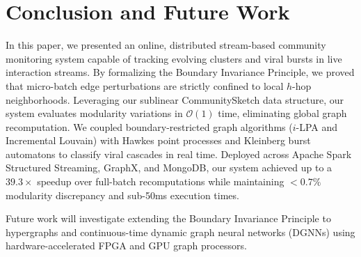 \documentclass[10pt,journal,compsoc]{IEEEtran}
\begin{document}
\section{Conclusion and Future Work}\label{sec:conclusion}
In this paper, we presented an online, distributed stream-based community monitoring system capable of tracking evolving clusters and viral bursts in live interaction streams. By formalizing the Boundary Invariance Principle, we proved that micro-batch edge perturbations are strictly confined to local $h$-hop neighborhoods. Leveraging our sublinear CommunitySketch data structure, our system evaluates modularity variations in $\mathcal{O}(1)$ time, eliminating global graph recomputation. We coupled boundary-restricted graph algorithms ($i$-LPA and Incremental Louvain) with Hawkes point processes and Kleinberg burst automatons to classify viral cascades in real time. Deployed across Apache Spark Structured Streaming, GraphX, and MongoDB, our system achieved up to a $39.3\times$ speedup over full-batch recomputations while maintaining $< 0.7\%$ modularity discrepancy and sub-50ms execution times.

Future work will investigate extending the Boundary Invariance Principle to hypergraphs and continuous-time dynamic graph neural networks (DGNNs) using hardware-accelerated FPGA and GPU graph processors.
\end{document}
